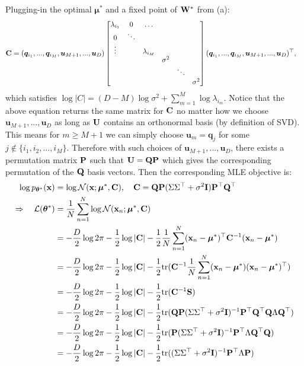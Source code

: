 Plugging-in the optimal $\bm{\mu}^*$ and a fixed point of $\mathbf W^*$ from (a): 
\begin{equation*}
\begin{aligned}
\mathbf C &= (\bm{q}_{i_1}, ..., \bm{q}_{i_M}, \bm{u}_{M+1}, ..., \bm{u}_D)
\begin{bmatrix} 
    \lambda_{i_1} & 0 & \dots \\
    0 & \ddots & \\
    \vdots &        & \lambda_{i_M} \\ 
     &   &  & \sigma^2 \\
     & & & & \ddots & \\
     & & & & &  \sigma^2
    \end{bmatrix} (\bm{q}_{i_1}, ..., \bm{q}_{i_M}, \bm{u}_{M+1}, ..., \bm{u}_D)^\top,
\end{aligned}
\end{equation*}
which satisfies $\log |C| = (D - M) \log \sigma^2 + \sum_{m=1}^M \log \lambda_{i_m}$. Notice that the above equation returns the same matrix for $\mathbf C$ no matter how we choose $\bm{u}_{M+1}, ..., \bm{u}_D$ as long as $\mathbf U$ contains an orthonormal basis (by definition of SVD). This means for $m \geq M+1$ we can simply choose $\bm{u}_m = \bm{q}_j$ for some $j \notin \{ i_1, i_2, ..., i_M \}$. Therefore with such choices of $\bm{u}_{M+1}, ..., \bm{u}_D$, there exists a permutation matrix $\mathbf{P}$ such that $\mathbf U = \mathbf{Q} \mathbf{P}$ which gives the corresponding permutation of the $\mathbf{Q}$ basis vectors. 
Then the corresponding MLE objective is:
\begin{equation*}
\begin{aligned}
\log p_{\bm{\theta}^*}(\mathbf{x}) &= \log \mathcal{N}(\mathbf{x}; \bm{\mu}^*,  \mathbf C), \quad \mathbf C = \mathbf{Q} \mathbf{P} (\Sigma \Sigma^\top + \sigma^2 \mathbf{I}) \mathbf{P}^\top \mathbf{Q}^\top \\
\Rightarrow \quad \mathcal{L}(\bm{\theta}^*) &= \frac{1}{N} \sum_{n=1}^N \log \mathcal{N}(\mathbf{x}_n; \bm{\mu}^*,  \mathbf C) \\
&= -\frac{D}{2} \log 2\pi -\frac{1}{2} \log |\mathbf C| - \frac{1}{2} \frac{1}{N} \sum_{n=1}^N (\mathbf{x}_n - \bm{\mu}^*)^\top \mathbf C^{-1} (\mathbf{x}_n - \bm{\mu}^*) \\
&= -\frac{D}{2} \log 2\pi -\frac{1}{2} \log |\mathbf C| - \frac{1}{2} \text{tr}( \mathbf C^{-1} \frac{1}{N} \sum_{n=1}^N (\mathbf{x}_n - \bm{\mu}^*)(\mathbf{x}_n - \bm{\mu}^*)^\top) \\
&= -\frac{D}{2} \log 2\pi -\frac{1}{2} \log |\mathbf C| - \frac{1}{2} \text{tr}( \mathbf C^{-1} \mathbf{S}) \\
&= -\frac{D}{2} \log 2\pi -\frac{1}{2} \log |\mathbf C| - \frac{1}{2} \text{tr}( \mathbf{Q} \mathbf{P} (\Sigma \Sigma^\top + \sigma^2 \mathbf{I})^{-1} \mathbf{P}^\top \mathbf{Q}^\top \mathbf{Q} \Lambda \mathbf{Q}^\top) \\
&= -\frac{D}{2} \log 2\pi -\frac{1}{2} \log |\mathbf C| - \frac{1}{2} \text{tr}(  \mathbf{P} (\Sigma \Sigma^\top + \sigma^2 \mathbf{I})^{-1} \mathbf{P}^\top \Lambda \mathbf{Q}^\top \mathbf{Q}) \\
&=  -\frac{D}{2} \log 2\pi -\frac{1}{2} \log |\mathbf C| - \frac{1}{2} \text{tr}( (\Sigma \Sigma^\top + \sigma^2 \mathbf{I})^{-1} \mathbf{P}^\top \Lambda \mathbf{P} )
\end{aligned}
\end{equation*}
